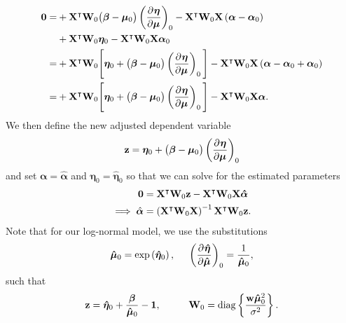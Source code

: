 \begin{align*}
  \mathbf{0} = &+ \mathbf{X}^\intercal \mathbf{W}_0 \big(\bm{\beta} - \bm{\mu}_0 \big) \left( \frac{\partial^{} \bm{\eta}}{\partial \bm{\mu}^{} } \right)_0 - \mathbf{X}^\intercal \mathbf{W}_0 \mathbf{X} \left( \bm{\alpha} - \bm{\alpha}_0 \right) \\
  &+ \mathbf{X}^\intercal \mathbf{W}_0 \bm{\eta}_0 - \mathbf{X}^\intercal \mathbf{W}_0 \mathbf{X} \bm{\alpha}_0 \\
  = &+ \mathbf{X}^\intercal \mathbf{W}_0 \Bigg[ \bm{\eta}_0 + \big(\bm{\beta} - \bm{\mu}_0 \big) \left( \frac{\partial^{} \bm{\eta}}{\partial \bm{\mu}^{} } \right)_0 \Bigg] - \mathbf{X}^\intercal \mathbf{W}_0 \mathbf{X} \left( \bm{\alpha} - \bm{\alpha}_0 + \bm{\alpha}_0 \right) \\
  = &+ \mathbf{X}^\intercal \mathbf{W}_0 \Bigg[ \bm{\eta}_0 + \big(\bm{\beta} - \bm{\mu}_0 \big) \left( \frac{\partial^{} \bm{\eta}}{\partial \bm{\mu}^{} } \right)_0 \Bigg] - \mathbf{X}^\intercal \mathbf{W}_0 \mathbf{X} \bm{\alpha}.
\end{align*}
We then define the new adjusted dependent variable
$$\mathbf{z} = \bm{\eta}_0 + \big(\bm{\beta} - \bm{\mu}_0\big) \left( \frac{\partial^{} \bm{\eta}}{\partial \bm{\mu}^{} } \right)_0$$
and set $\bm{\alpha} = \bm{\hat{\alpha}}$ and $\bm{\eta}_0 = \bm{\hat{\eta}}_0$ so that we can solve for the estimated parameters
\begin{align*}
  \mathbf{0} &= \mathbf{X}^\intercal \mathbf{W}_0 \mathbf{z} - \mathbf{X}^\intercal \mathbf{W}_0 \mathbf{X} \bm{\hat{\alpha}} \\
  \implies \hat{\bm{\alpha}} &= \left( \mathbf{X}^\intercal \mathbf{W}_0 \mathbf{X} \right)^{-1} \mathbf{X}^\intercal \mathbf{W}_0 \mathbf{z}.
\end{align*}
Note that for our log-normal model, we use the substitutions
\begin{align*}
  \bm{\hat{\mu}}_0 = \exp\left( \bm{\hat{\eta}}_0 \right), \hspace{5mm} \left( \frac{\partial^{} \bm{\hat{\eta}}}{\partial \bm{\hat{\mu}}^{} } \right)_0 = \frac{1}{\bm{\hat{\mu}}_0},
\end{align*}
such that
\begin{align*}
  \mathbf{z} = \bm{\hat{\eta}}_0 + \frac{\bm{\beta}}{\bm{\hat{\mu}}_0} - \mathbf{1}, \hspace{10mm} 
  \mat{W}_0 = \diag\left\{ \frac{\mathbf{w} \bm{\hat{\mu}}_0^2}{\sigma^2} \right\}.
\end{align*}

